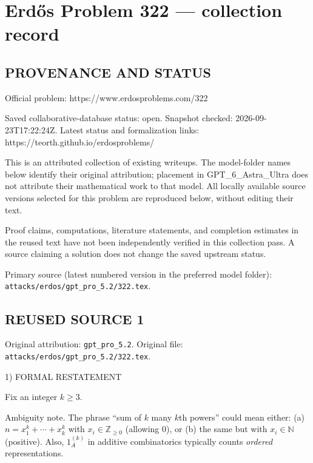 \section*{Erd\H{o}s Problem 322 --- collection record}

\subsection*{PROVENANCE AND STATUS}
Official problem: https://www.erdosproblems.com/322

Saved collaborative-database status: open.
Snapshot checked: 2026-09-23T17:22:24Z.
Latest status and formalization links: https://teorth.github.io/erdosproblems/

This is an attributed collection of existing writeups. The model-folder names below identify their original attribution; placement in GPT\_6\_Astra\_Ultra does not attribute their mathematical work to that model. All locally available source versions selected for this problem are reproduced below, without editing their text.

Proof claims, computations, literature statements, and completion estimates in the reused text have not been independently verified in this collection pass. A source claiming a solution does not change the saved upstream status.

Primary source (latest numbered version in the preferred model folder): \texttt{attacks/erdos/gpt\_pro\_5.2/322.tex}.

\subsection*{REUSED SOURCE 1}
Original attribution: \texttt{gpt\_pro\_5.2}.
Original file: \texttt{attacks/erdos/gpt\_pro\_5.2/322.tex}.


1) FORMAL RESTATEMENT

Fix an integer $k\ge 3$.

Ambiguity note.
The phrase ``sum of $k$ many $k$th powers'' could mean either:
(a) $n=x_1^k+\cdots+x_k^k$ with $x_i\in\mathbb Z_{\ge 0}$ (allowing $0$), or
(b) the same but with $x_i\in\mathbb N$ (positive).
Also, $1_A^{(k)}$ in additive combinatorics typically counts \emph{ordered} representations.

